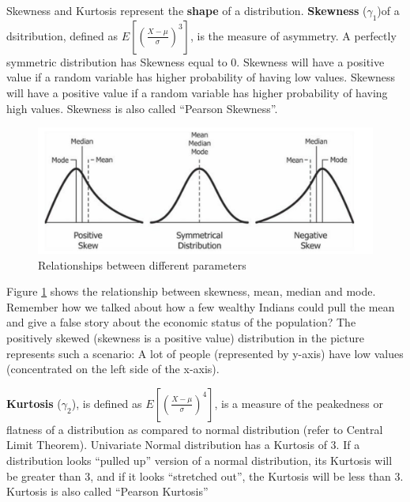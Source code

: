 Skewness and Kurtosis represent the \textbf{shape} of a distribution. \textbf{Skewness} ($\gamma_1$)of a dsitribution, defined as \( E[(\frac{X-\mu}{\sigma})^3] \), is the measure of asymmetry. A perfectly symmetric distribution has Skewness equal to $0$. Skewness will have a positive value if a random variable has higher probability of having low values. Skewness will have a positive value if a random variable has higher probability of having high values. Skewness is also called ``Pearson Skewness''.
	\begin{figure}
	  \centering
	    \includegraphics[width=\textwidth]{Statistics/Relationship_between_mean_and_median_under_different_skewness}
	  \caption{Relationships between different parameters}
	  \label{fig:parameter_interrelationship}
	\end{figure}

Figure \ref{fig:parameter_interrelationship} shows the relationship between skewness, mean, median and mode. Remember how we talked about how a few wealthy Indians could pull the mean and give a false story about the economic status of the population? The positively skewed (skewness is a positive value) distribution in the picture represents such a scenario: A lot of people (represented by y-axis) have low values (concentrated on the left side of the x-axis). 

\textbf{Kurtosis} ($\gamma_2$), is defined as \( E[(\frac{X-\mu}{\sigma})^4] \), is a measure of the peakedness or flatness of a distribution as compared to normal distribution (refer to Central Limit Theorem). Univariate Normal distribution has a Kurtosis of 3. If a distribution looks ``pulled up'' version of a normal distribution, its Kurtosis will be greater than 3, and if it looks ``stretched out'', the Kurtosis will be less than 3. Kurtosis is also called ``Pearson Kurtosis''


